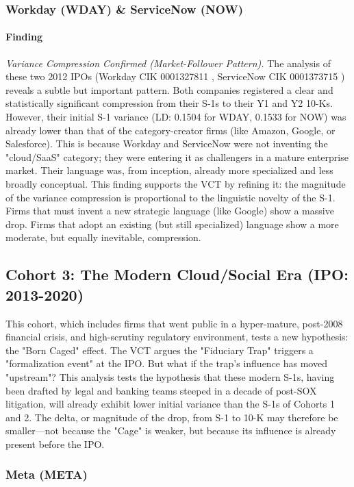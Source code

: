 \documentclass[12pt, letterpaper]{article}
\begin{document}
\subsubsection{Workday (WDAY) \& ServiceNow (NOW)}
\paragraph{Finding} \textit{Variance Compression Confirmed (Market-Follower Pattern).}
The analysis of these two 2012 IPOs (Workday CIK 0001327811 \cite{key12, key35}, ServiceNow CIK 0001373715 \cite{key13, key36}) reveals a subtle but important pattern. Both companies registered a clear and statistically significant compression from their S-1s to their Y1 \cite{key37} and Y2 10-Ks. However, their initial S-1 variance (LD: 0.1504 for WDAY, 0.1533 for NOW) was already lower than that of the category-creator firms (like Amazon, Google, or Salesforce). This is because Workday and ServiceNow were not inventing the "cloud/SaaS" category; they were entering it as challengers in a mature enterprise market. Their language was, from inception, already more specialized and less broadly conceptual. This finding supports the VCT by refining it: the magnitude of the variance compression is proportional to the linguistic novelty of the S-1. Firms that must invent a new strategic language (like Google) show a massive drop. Firms that adopt an existing (but still specialized) language show a more moderate, but equally inevitable, compression.

\subsection{Cohort 3: The Modern Cloud/Social Era (IPO: 2013-2020)}
This cohort, which includes firms that went public in a hyper-mature, post-2008 financial crisis, and high-scrutiny regulatory environment, tests a new hypothesis: the "Born Caged" effect. The VCT argues the "Fiduciary Trap" triggers a "formalization event" at the IPO. But what if the trap's influence has moved "upstream"? This analysis tests the hypothesis that these modern S-1s, having been drafted by legal and banking teams steeped in a decade of post-SOX litigation, will already exhibit lower initial variance than the S-1s of Cohorts 1 and 2. The delta, or magnitude of the drop, from S-1 to 10-K may therefore be smaller—not because the "Cage" is weaker, but because its influence is already present before the IPO.

\subsubsection{Meta (META)}
\end{document}
